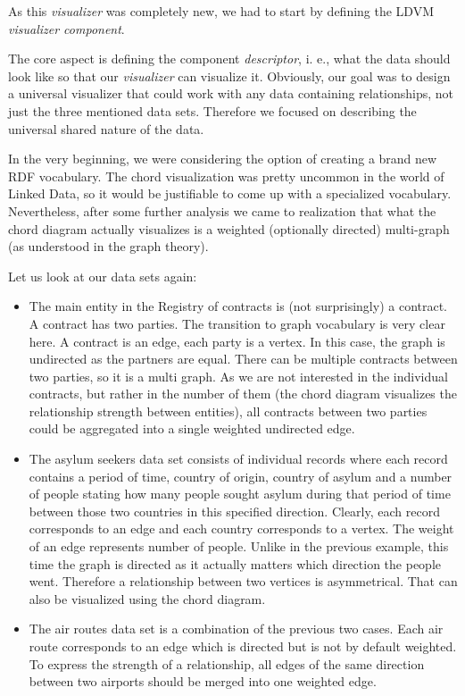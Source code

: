 As this \emph{visualizer} was completely new, we had to start by defining the LDVM \emph{visualizer component}.

The core aspect is defining the component \emph{descriptor}, i. e., what the data should look like so that our \emph{visualizer} can visualize it. Obviously, our goal was to design a universal visualizer that could work with any data containing relationships, not just the three mentioned data sets. Therefore we focused on describing the universal shared nature of the data.

In the very beginning, we were considering the option of creating a brand new RDF vocabulary. The chord visualization was pretty uncommon in the world of Linked Data, so it would be justifiable to come up with a specialized vocabulary. Nevertheless, after some further analysis we came to realization that what the chord diagram actually visualizes is a weighted (optionally directed) multi-graph (as understood in the graph theory).

Let us look at our data sets again:

\begin{itemize}
\item The main entity in the Registry of contracts is (not surprisingly) a contract. A contract has two parties. The transition to graph vocabulary is very clear here. A contract is an edge, each party is a vertex. In this case, the graph is undirected as the partners are equal. There can be multiple contracts between two parties, so it is a multi graph. As we are not interested in the individual contracts, but rather in the number of them (the chord diagram visualizes the relationship strength between entities), all contracts between two parties could be aggregated into a single weighted undirected edge.
\item The asylum seekers data set consists of individual records where each record contains a period of time, country of origin, country of asylum and a number of people stating how many people sought asylum during that period of time between those two countries in this specified direction. Clearly, each record corresponds to an edge and each country corresponds to a vertex. The weight of an edge represents number of people. Unlike in the previous example, this time the graph is directed as it actually matters which direction the people went. Therefore a relationship between two vertices is asymmetrical. That can also be visualized using the chord diagram.
\item The air routes data set is a combination of the previous two cases. Each air route corresponds to an edge which is directed but is not by default weighted. To express the strength of a relationship, all edges of the same direction between two airports should be merged into one weighted edge.
\end{itemize}

